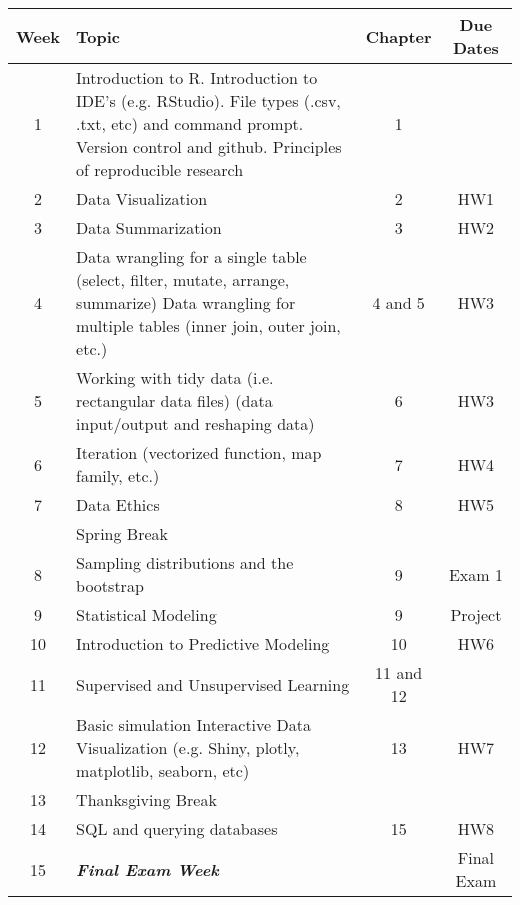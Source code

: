 \documentclass{article}\usepackage[]{graphicx}\usepackage[]{color}
\begin{document}
\begin{center}
\begin{tabular}{ |c|p{5cm}|c|c| } 
 \hline
 Week & Topic & Chapter & Due Dates\\
  \hline 
 1 & Introduction to R.   Introduction to IDE's (e.g. RStudio).  File types (.csv, .txt, etc) and command prompt. Version control and github. Principles of reproducible research & 1 &  \\ 
   \hline 
 2 & Data Visualization & 2 & HW1 \\
   \hline 
  3 & Data Summarization & 3 & HW2 \\
    \hline 
    4 &Data wrangling for a single table (select, filter, mutate, arrange, summarize)
Data wrangling for multiple tables (inner join, outer join, etc.)
 & 4 and 5 & HW3 \\
   \hline 
     5 & Working with tidy data (i.e. rectangular data files) (data input/output and reshaping data) & 6 & HW3 \\ 
 \hline
      6 & Iteration (vectorized function, map family, etc.)& 7 & HW4\\ 
      \hline
            7 & Data Ethics & 8 & HW5\\ 
            \hline 
                        & Spring Break & \\ 
            \hline
                        8 & Sampling distributions and the bootstrap & 9 & Exam 1\\ 
                                    \hline 
                        9 &Statistical Modeling & 9 & Project\\ 
                                                            \hline 
                        10 & Introduction to Predictive Modeling & 10 & HW6 \\ 
                                                                                    \hline 
                        11 & Supervised and Unsupervised Learning & 11 and 12 & \\ 
                                                                                    \hline 
                        12 & Basic simulation Interactive Data Visualization (e.g. Shiny, plotly, matplotlib, seaborn, etc) & 13 & HW7 \\ 
                                                                                    \hline 
                        13 & Thanksgiving Break &  &  \\ 
                                                                                                            \hline 
                        14 & SQL and querying databases & 15 & HW8 \\ 
                                                                                                            \hline 
                        15 & {\bf \em Final Exam Week} & & Final Exam\\ 
                        \hline
                        \end{tabular}

\end{center}
\end{document}

